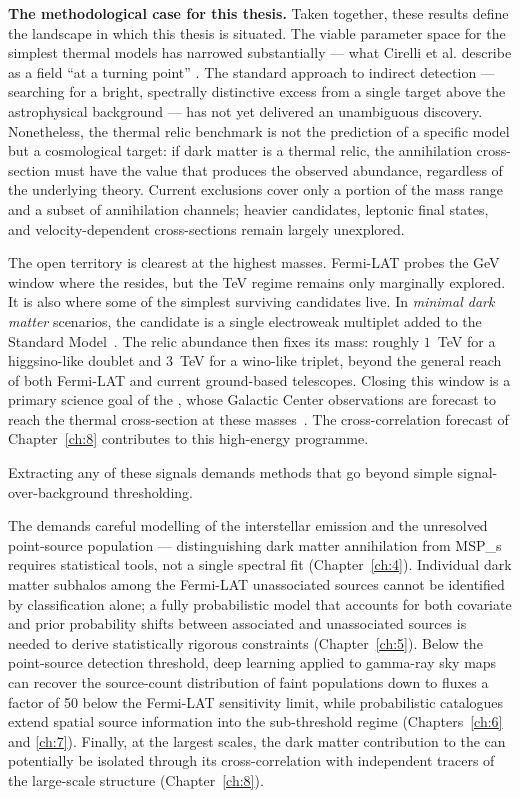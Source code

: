 \textbf{The methodological case for this thesis.}
Taken together, these results define the landscape in which this thesis is situated.
The viable parameter space for the simplest thermal \WIMP models has narrowed substantially --- what Cirelli et al.
describe as a field ``at a turning point'' \cite{Cirelli:2024ssz}.
The standard approach to indirect detection --- searching for a bright, spectrally distinctive excess from a single target above the astrophysical background --- has not yet delivered an unambiguous discovery.
Nonetheless, the thermal relic benchmark is not the prediction of a specific model but a cosmological target: if dark matter is a thermal relic, the annihilation cross-section must have the value that produces the observed abundance, regardless of the underlying theory.
Current exclusions cover only a portion of the mass range and a subset of annihilation channels; heavier candidates, leptonic final states, and velocity-dependent cross-sections remain largely unexplored.

The open territory is clearest at the highest masses.
Fermi-LAT probes the GeV window where the \GCE resides, but the TeV regime remains only marginally explored.
It is also where some of the simplest surviving \WIMP candidates live.
In \emph{minimal dark matter} scenarios, the candidate is a single electroweak multiplet added to the Standard Model~\cite{Cirelli:2005uq}.
The relic abundance then fixes its mass: roughly $1$~TeV for a higgsino-like doublet and $3$~TeV for a wino-like triplet, beyond the general reach of both Fermi-LAT and current ground-based telescopes.
Closing this window is a primary science goal of the \CTAO, whose Galactic Center observations are forecast to reach the thermal cross-section at these masses~\cite{CTA:2020qlo}.
The cross-correlation forecast of Chapter~\ref{ch:8} contributes to this high-energy programme.

Extracting any of these signals demands methods that go beyond simple signal-over-background thresholding.

The \GCE demands careful modelling of the interstellar emission and the unresolved point-source population --- distinguishing dark matter annihilation from \glspl{MSP_} requires statistical tools, not a single spectral fit (Chapter~\ref{ch:4}).
Individual dark matter subhalos among the Fermi-LAT unassociated sources cannot be identified by classification alone; a fully probabilistic model that accounts for both covariate and prior probability shifts between associated and unassociated sources is needed to derive statistically rigorous constraints (Chapter~\ref{ch:5}).
Below the point-source detection threshold, deep learning applied to gamma-ray sky maps can recover the source-count distribution of faint populations down to fluxes a factor of 50 below the Fermi-LAT sensitivity limit, while probabilistic catalogues extend spatial source information into the sub-threshold regime (Chapters~\ref{ch:6} and \ref{ch:7}).
Finally, at the largest scales, the dark matter contribution to the \UGRB can potentially be isolated through its cross-correlation with independent tracers of the large-scale structure (Chapter~\ref{ch:8}).


